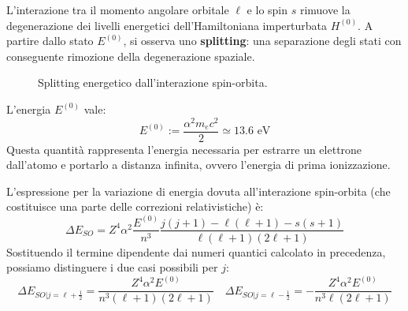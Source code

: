 L'interazione tra il momento angolare orbitale \( \ell \) e lo spin \( s \) rimuove la degenerazione dei livelli energetici dell'Hamiltoniana imperturbata \( H^{(0)} \). 
A partire dallo stato \( E^{(0)} \), si osserva uno \textbf{splitting}: una separazione degli stati con conseguente rimozione della degenerazione spaziale.

\begin{figure}[htbp]
    \centering
    \caption{Splitting energetico dall'interazione spin-orbita.}
\end{figure}

L'energia \( E^{(0)} \) vale:
\begin{equation}
    E^{(0)} := \frac{\alpha^2 m_e c^2}{2} \simeq 13.6 \text{ eV}
\end{equation}
Questa quantità rappresenta l'energia necessaria per estrarre un elettrone dall'atomo e portarlo a distanza infinita, ovvero l'energia di prima ionizzazione. 

L'espressione per la variazione di energia dovuta all'interazione spin-orbita (che costituisce una parte delle correzioni relativistiche) è:
\begin{equation}
    \Delta E_{SO} = Z^4 \alpha^2 \frac{E^{(0)}}{n^3} \frac{j(j+1) - \ell(\ell+1) - s(s+1)}{\ell(\ell+1)(2\ell+1)}
\end{equation}
Sostituendo il termine dipendente dai numeri quantici calcolato in precedenza, possiamo distinguere i due casi possibili per \( j \):
\begin{equation}
    \Delta E_{SO|j=\ell+\frac{1}{2}} = \frac{Z^4 \alpha^2 E^{(0)}}{n^3 (\ell+1)(2\ell+1)} \quad 
    \Delta E_{SO|j=\ell-\frac{1}{2}} = - \frac{Z^4 \alpha^2 E^{(0)}}{n^3 \ell(2\ell+1)} 
\end{equation}

